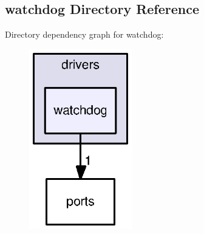\subsection{watchdog Directory Reference}
\label{dir_0528fc9ad0c1fcc312759d3069f7868c}
Directory dependency graph for watchdog\+:
\nopagebreak
\begin{figure}[H]
\begin{center}
\leavevmode
\includegraphics[width=127pt]{dir_0528fc9ad0c1fcc312759d3069f7868c_dep}
\end{center}
\end{figure}
